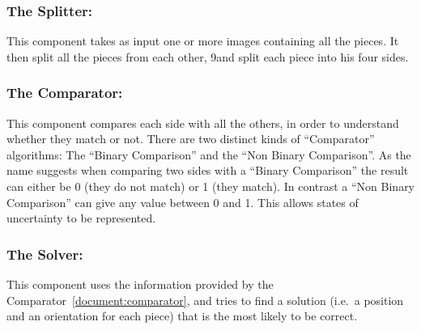 \documentclass{article}
\newenvironment{indented_section}
  {\adjustwidth{3em}{0pt}}
  {\endadjustwidth}
\begin{document}
\begin{indented_section}

    \subsubsection{The Splitter:} This component takes as input one or more images
    containing all the pieces. It then split all the pieces from each other,
    9and split each piece into his four sides.\label{document:splitter}

    \subsubsection{The Comparator:} This component compares each side with all the
    others, in order to understand whether they match or not.\newline
    There are two distinct kinds of “Comparator” algorithms:
    The “Binary Comparison” and the “Non Binary Comparison”.
    As the name suggests when comparing two sides with a “Binary Comparison”
    the result can either be 0 (they do not match) or 1 (they match).
    In contrast a “Non Binary Comparison” can give any value between 0 and 1.
    This allows states of uncertainty to be represented.\label{document:comparator}

    \subsubsection{The Solver:} This component  uses the information provided by the
    Comparator~\ref{document:comparator}, and tries to find a solution
    (i.e.\ a position and an orientation for each piece)
    that is the most likely to be correct.\label{document:solver}

\end{indented_section}
\end{document}
